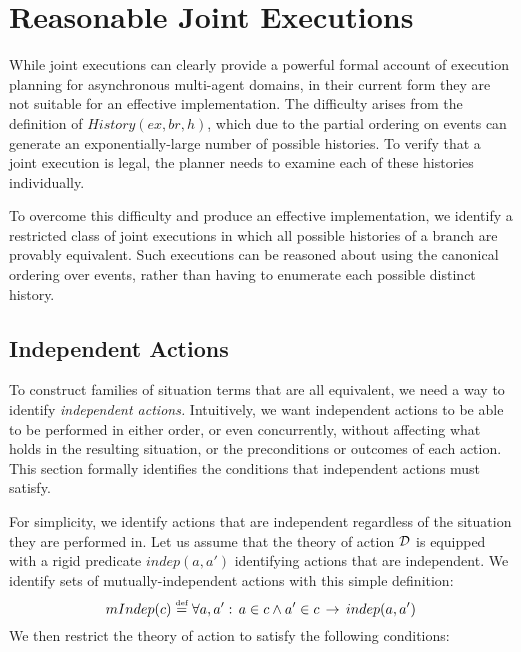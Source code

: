 \section{Reasonable Joint Executions\label{sec:JointExec:Reasonable}}

While joint executions can clearly provide a powerful formal account
of execution planning for asynchronous multi-agent domains, in their
current form they are not suitable for an effective implementation.
The difficulty arises from the definition of $History(ex,br,h)$,
which due to the partial ordering on events can generate an exponentially-large
number of possible histories. To verify that a joint execution is
legal, the planner needs to examine each of these histories individually.

To overcome this difficulty and produce an effective implementation,
we identify a restricted class of joint executions in which all possible
histories of a branch are provably equivalent. Such executions can
be reasoned about using the canonical ordering over events, rather
than having to enumerate each possible distinct history.


\subsection{Independent Actions}

To construct families of situation terms that are all equivalent,
we need a way to identify \emph{independent actions.} Intuitively,
we want independent actions to be able to be performed in either order,
or even concurrently, without affecting what holds in the resulting
situation, or the preconditions or outcomes of each action. This section
formally identifies the conditions that independent actions must satisfy.

For simplicity, we identify actions that are independent regardless
of the situation they are performed in. Let us assume that the theory
of action $\mathcal{D}$ is equipped with a rigid predicate $indep(a,a')$
identifying actions that are independent. We identify sets of mutually-independent
actions with this simple definition:\[
mIndep(c)\stackrel{\mbox{\tiny def}}{=}\forall a,a':\, a\in c\wedge a'\in c\,\rightarrow\, indep(a,a')\]
 We then restrict the theory of action to satisfy the following conditions:

